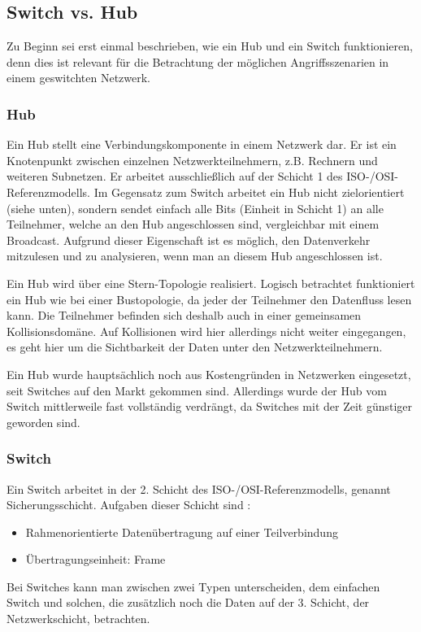 \subsection{Switch vs. Hub}
\label{sec:geswitchtes_netz}

Zu Beginn sei erst einmal beschrieben, wie ein Hub und ein Switch funktionieren, denn dies ist relevant für die Betrachtung der möglichen Angriffsszenarien in einem geswitchten Netzwerk.

\subsubsection{Hub}
Ein Hub stellt eine Verbindungskomponente in einem Netzwerk dar. Er ist ein Knotenpunkt zwischen einzelnen Netzwerkteilnehmern, z.B. Rechnern und weiteren Subnetzen.
Er arbeitet ausschließlich auf der Schicht 1 des ISO-/OSI-Referenzmodells. Im Gegensatz zum Switch arbeitet ein Hub nicht zielorientiert (siehe unten), sondern sendet einfach alle Bits (Einheit in Schicht 1) an alle Teilnehmer, welche an den Hub angeschlossen sind, vergleichbar mit einem Broadcast. Aufgrund dieser Eigenschaft ist es möglich, den Datenverkehr mitzulesen und zu analysieren, wenn man an diesem Hub angeschlossen ist.

Ein Hub wird über eine Stern-Topologie realisiert.
Logisch betrachtet funktioniert ein Hub wie bei einer Bustopologie, da jeder der Teilnehmer den Datenfluss lesen kann. Die Teilnehmer befinden sich deshalb auch in einer gemeinsamen Kollisionsdomäne. Auf Kollisionen wird hier allerdings nicht weiter eingegangen, es geht hier um die Sichtbarkeit der Daten unter den Netzwerkteilnehmern.

Ein Hub wurde hauptsächlich noch aus Kostengründen in Netzwerken eingesetzt, seit Switches auf den Markt gekommen sind. Allerdings wurde der Hub vom Switch mittlerweile fast vollständig verdrängt, da Switches mit der Zeit günstiger geworden sind.

\subsubsection{Switch}
Ein Switch arbeitet in der 2. Schicht des ISO-/OSI-Referenzmodells, genannt Sicherungsschicht.
Aufgaben dieser Schicht sind \cite[vgl.]{netzwerkeI}:
\begin{itemize}
\item Rahmenorientierte Datenübertragung auf einer Teilverbindung
\item Übertragungseinheit: Frame
\end{itemize}
Bei Switches kann man zwischen zwei Typen unterscheiden, dem einfachen Switch und solchen, die zusätzlich noch die Daten auf der 3. Schicht, der Netzwerkschicht, betrachten.

